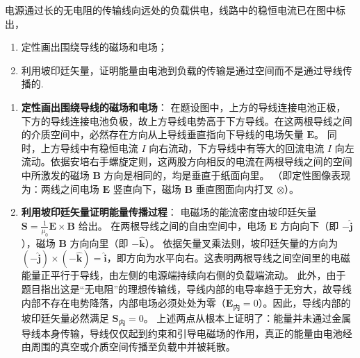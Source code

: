 \begin{exercise}\label{ex:20.5}
电源通过长的无电阻的传输线向远处的负载供电，线路中的稳恒电流已在图中标出，
\begin{enumerate}
  \item[(a)] 定性画出围绕导线的磁场和电场；
  \item[(b)] 利用坡印廷矢量，证明能量由电池到负载的传输是通过空间而不是通过导线传播的.
\end{enumerate}
\begin{center}
\end{center}
\end{exercise}
\begin{solution}
\begin{enumerate}
    \item[(a)] \textbf{定性画出围绕导线的磁场和电场}：
    在题设图中，上方的导线连接电池正极，下方的导线连接电池负极，故上方导线电势高于下方导线。在这两根导线之间的介质空间中，必然存在方向从上导线垂直指向下导线的电场矢量 $\boldsymbol{E}$。
    同时，上方导线中有稳恒电流 $I$ 向右流动，下方导线中有等大的回流电流 $I$ 向左流动。依据安培右手螺旋定则，这两股方向相反的电流在两根导线之间的空间中所激发的磁场 $\boldsymbol{B}$ 方向是相同的，均是垂直于纸面向里。
    （即定性图像表现为：两线之间电场 $\boldsymbol{E}$ 竖直向下，磁场 $\boldsymbol{B}$ 垂直图面向内打叉 $\otimes$）。

    \item[(b)] \textbf{利用坡印廷矢量证明能量传播过程}：
    电磁场的能流密度由坡印廷矢量 $\boldsymbol{S} = \frac{1}{\mu_0} \boldsymbol{E} \times \boldsymbol{B}$ 给出。
    在两根导线之间的自由空间中，电场 $\boldsymbol{E}$ 方向向下（即 $-\hat{\boldsymbol{j}}$），磁场 $\boldsymbol{B}$ 方向向里（即 $-\hat{\boldsymbol{k}}$）。
    依据矢量叉乘法则，坡印廷矢量的方向为 $(-\hat{\boldsymbol{j}}) \times (-\hat{\boldsymbol{k}}) = \hat{\boldsymbol{i}}$，即方向为水平向右。这表明两根导线之间空间里的电磁能量正平行于导线，由左侧的电源端持续向右侧的负载端流动。
    此外，由于题目指出这是“无电阻”的理想传输线，导线内部的电导率趋于无穷大，故导线内部不存在电势降落，内部电场必须处处为零（$\boldsymbol{E}_{\text{内}} = 0$）。因此，导线内部的坡印廷矢量必然满足 $\boldsymbol{S}_{\text{内}} = 0$。
    上述两点从根本上证明了：能量并未通过金属导线本身传输，导线仅仅起到约束和引导电磁场的作用，真正的能量由电池经由周围的真空或介质空间传播至负载中并被耗散。
\end{enumerate}
\end{solution}


